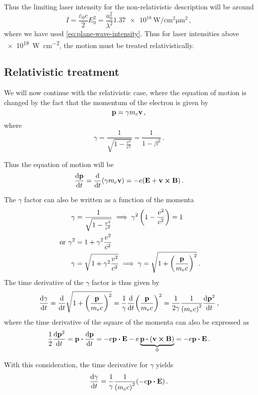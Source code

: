 \documentclass[12pt, class=report, crop=false]{standalone}
\begin{document}
Thus the limiting laser intensity for the non-relativistic description will be around
\[
I = \frac{\varepsilon_0 c}{2} E_0^2 =
\frac{a_0^2}{\lambda^2} \SI{1.37e18}{\watt\per\centi\metre\squared\micro\metre\squared}\,,
\]
where we have used \cref{eq:plane-wave-intensity}.
Thus for laser intensities above \SI{e18}{\watt\per\centi\metre\squared},
the motion must be treated relativistically.

\subsection{Relativistic treatment}

We will now continue with the relativistic case, where the equation
of motion is changed by the fact that the momentum of the electron is given by
\[
\vb{p} = \gamma m_e \vb{v}\,,
\]
where
\[
\gamma = \frac{1}{\sqrt{1-\frac{v^2}{c^2}}} = \frac{1}{1-\beta^2}\,.
\]

Thus the equation of motion will be
\begin{equation}
  \label{eq:relativistic-lorentz}
  \dv{\vb{p}}{t} = \dv{t}(\gamma m_e \vb{v}) = -e (\vb{E} + \vb{v}\cp\vb{B})\,.
\end{equation}

The \(\gamma\) factor can also be written as a function of the momenta
\[
\begin{aligned}
  \gamma &= \frac{1}{\sqrt{1-\frac{v^2}{c^2}}} \implies
  \gamma^2\left(1-\frac{v^2}{c^2}\right)=1\\ \text{ or }
  \gamma^2 &= 1+\gamma^2\frac{v^2}{c^2}\\
  \gamma &= \sqrt{1+\gamma^2\frac{v^2}{c^2}} \implies
  \gamma = \sqrt{1 + {\left(\frac{\vb{p}}{m_e c}\right)}^2}\,.
\end{aligned}
\]
The time derivative of the \(\gamma\) factor is thus given by
\[
\dv{\gamma}{t} = \dv{t}\sqrt{1+{\left(\frac{\vb{p}}{m_e c}\right)}^2} =
\frac{1}{\gamma} {\dv{t}} {\left(\frac{\vb{p}}{m_e c}\right)}^2 =
\frac{1}{2\gamma}\frac{1}{{(m_e c)}^2} \dv{\vb{p}^2}{t}\,,
\]
where the time derivative of the square of the momenta can also be expressed as
\[
\frac{1}{2}\dv{\vb{p}^2}{t} = \vb{p}\vdot\dv{\vb{p}}{t} =
-e\vb{p}\vdot\vb{E}-e\underbrace{\vb{p}\vdot(\vb{v}\cp\vb{B})}_0 =
-e\vb{p}\vdot\vb{E}\,.
\]

With this consideration, the time derivative for \(\gamma\) yields
\begin{equation}
  \label{eq:gamma-time-derivative}
  \dv{\gamma}{t} = \frac{1}{\gamma} \frac{1}{{(m_e c)}^2} (-e\vb{p}\vdot\vb{E})\,.
\end{equation}
\end{document}
